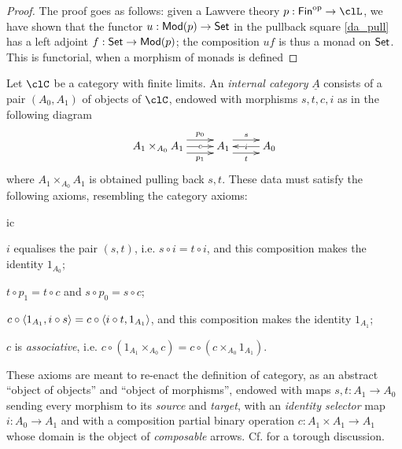 \begin{proof}
	The proof goes as follows: given a Lawvere theory $p : \textsf{Fin}^\op \to \clL$, we have shown that the functor $u : \mathsf{Mod}(p) \to \mathsf{Set}$ in the pullback square \autoref{da_pull} has a left adjoint $f : \mathsf{Set} \to \mathsf{Mod}(p)$; the composition $uf$ is thus a monad on $\mathsf{Set}$. This is functorial, when a morphism of monads is defined
\end{proof}
\begin{definition}
	\label{internista}
	Let  $\clC$ be a category with finite limits. An \emph{internal category} $\underline{A}$ consists of a pair $(A_0, A_1)$ of objects of $\clC$, endowed with morphisms $s,t,c,i$ as in the following diagram
	\[
		\xymatrix{
		A_1 \times_{A_0} A_1 \ar[r]|-c \ar@<6pt>[r]^-{p_0}  \ar@<-6pt>[r]_-{p_1} & A_1 \ar@<6pt>[r]^s  \ar@<-6pt>[r]_t & A_0 \ar[l]|i
		}
	\]
	where $A_1 \times_{A_0} A_1$ is obtained pulling back $s,t$. These data must satisfy the following axioms, resembling the category axioms:
	\begin{enumtag}{ic}
		\item $i$ equalises the pair $(s,t)$, i.e. $s\circ i= t\circ i$, and this composition makes the identity $1_{A_0}$;
		\item $t\circ p_1 = t\circ c$ and $s\circ p_0 = s \circ c$;
		\item $c\circ\langle 1_{A_1},i\circ s\rangle = c\circ\langle i\circ t, 1_{A_1}\rangle$, and this composition makes the identity $1_{A_1}$;
		\item $c$ is \emph{associative}, i.e. $c \circ (1_{A_1}\times_{A_0} c)= c \circ (c \times_{A_0} 1_{A_1})$.
	\end{enumtag}
\end{definition}
These axioms are meant to re-enact the definition of category, as an abstract ``object of objects'' and ``object of morphisms'', endowed with maps $s,t: A_1 \to A_0$ sending every morphism to its \emph{source} and \emph{target}, with an \emph{identity selector} map $i : A_0 \to A_1$ and with a composition partial binary operation $c : A_1 \times A_1 \to A_1$ whose domain is the object of \emph{composable} arrows. Cf. \cite[8]{Bor1} for a torough discussion.